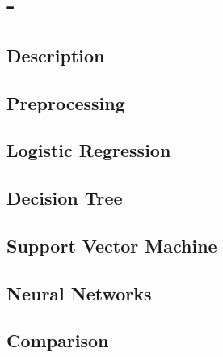 \section{-}
\label{db:sec:ds2}
\subsection{Description}

\subsection{Preprocessing}

\subsection{Logistic Regression}

\subsection{Decision Tree}

\subsection{Support Vector Machine}

\subsection{Neural Networks}

\subsection{Comparison}
